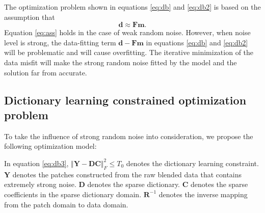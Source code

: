 The optimization problem shown in equations \ref{eq:db} and \ref{eq:db2} is based on the assumption that 
\begin{equation}
\label{eq:ass}
\mathbf{d}\approx \mathbf{F}\mathbf{m}.
\end{equation}
Equation \ref{eq:ass} holds in the case of weak random noise. However, when noise level is strong, the data-fitting term $\mathbf{d}-\mathbf{F}\mathbf{m}$ in equations \ref{eq:db} and \ref{eq:db2} will be problematic and will cause overfitting. The iterative minimization of the data misfit will make the strong random noise fitted by the model and the  solution far from accurate.

\subsection{Dictionary learning constrained optimization problem}
To take the influence of strong random noise into consideration, we propose the following optimization model:

In equation \ref{eq:db3}, $\Vert \mathbf{Y}-\mathbf{D}\mathbf{C}\Vert_F^2\le T_0$ denotes the dictionary learning constraint. $\mathbf{Y}$ denotes the patches constructed from the raw blended data that contains extremely strong noise. $\mathbf{D}$ denotes the sparse dictionary. $\mathbf{C}$ denotes the sparse coefficients in the  sparse dictionary domain.  $\mathbf{R}^{-1}$ denotes the inverse mapping from the patch domain to data domain.  



